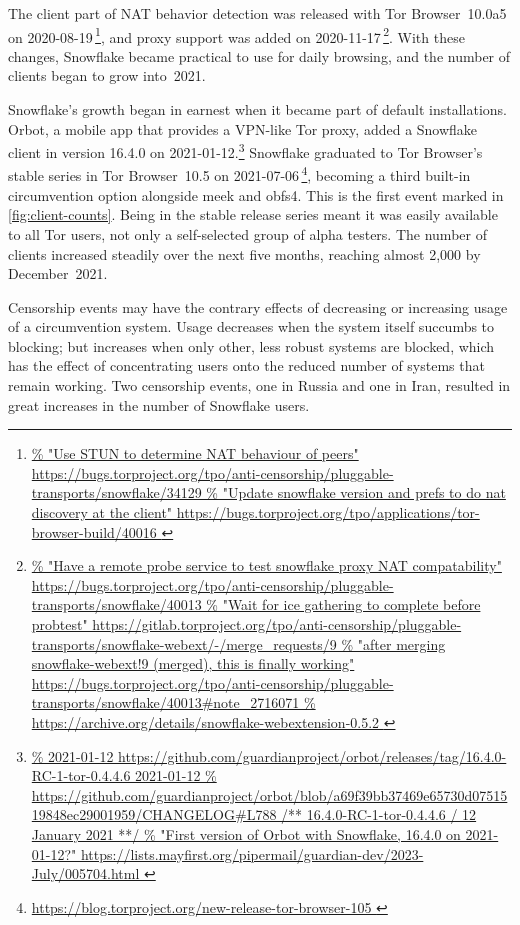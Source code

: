 \documentclass[letterpaper,twocolumn]{article}
\newlength{\urlfootnotesize}
\newcommand{\urlfootnote}[1]{\footnote{
\raggedright\hangindent\footnotemargin%
\fontsize{\urlfootnotesize}{\urlfootnotesize}\selectfont%
\url{#1}
}}
\begin{document}
The client part of NAT behavior detection
was released with Tor Browser~10.0a5 on \mbox{2020-08-19}\,\urlfootnote{
https://bugs.torproject.org/tpo/anti-censorship/pluggable-transports/snowflake/34129
},
and proxy support was added on \mbox{2020-11-17}\,\urlfootnote{
https://bugs.torproject.org/tpo/anti-censorship/pluggable-transports/snowflake/40013
}.
With these changes, Snowflake became practical to use for daily browsing,
and the number of clients began to grow into~2021.

Snowflake's growth began in earnest
when it became part of default installations.
Orbot, a mobile app that provides a VPN-like Tor proxy,
added a Snowflake client in version 16.4.0
on \mbox{2021-01-12}.\urlfootnote{
https://github.com/guardianproject/orbot/releases/tag/16.4.0-RC-1-tor-0.4.4.6 2021-01-12
}
Snowflake graduated to Tor Browser's stable series
in Tor Browser~10.5
on \mbox{2021-07-06}\,\urlfootnote{
https://blog.torproject.org/new-release-tor-browser-105
},
becoming a third built-in circumvention option
alongside meek and obfs4.
This is the first event marked in \autoref{fig:client-counts}.
Being in the stable release series meant it was
easily available to all Tor users,
not only a self-selected group of alpha testers.
The number of clients increased steadily
over the next five months,
reaching almost 2,000 by December~2021.

Censorship events may have the contrary effects
of decreasing or increasing usage
of a circumvention system.
Usage decreases
when the system itself succumbs to blocking;
but increases when only other, less robust
systems are blocked,
which has the effect of concentrating users
onto the reduced number of systems that remain working.
Two censorship events,
one in Russia and one in Iran,
resulted in great increases in the number of Snowflake users.
\end{document}
